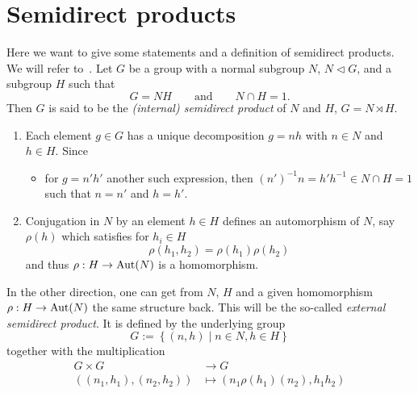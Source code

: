 \chapter{Semidirect products}
\begin{comment}
  see
  \begin{itemize}
    \item \url{http://nlab.mathforge.org/nlab/show/semidirect+product+group}
    \item \url{http://en.wikipedia.org/wiki/Semidirect_product}
    \item \cite{Robinson2003An}
  \end{itemize}
\end{comment}
Here we want to give some statements and a definition of semidirect products.
We will refer to~\cite[75]{Robinson2003An}.
Let $G$ be a group with a normal subgroup $N$, $N\vartriangleleft G$, and a
subgroup $H$ such that
\[
  G=NH\qquad\text{and}\qquad N\cap H=1.
\]
Then $G$ is said to be the \emph{(internal) semidirect product} of $N$ and $H$,
$G=N\rtimes H$.
\begin{rem}
  \begin{enumerate}
    \item Each element $g\in G$ has a unique decomposition $g=nh$ with $n\in N$
      and $h\in H$. Since
      \begin{itemize}
        \item[] for $g=n'h'$ another such expression, then
          $(n')^{-1}n=h'h^{-1}\in N\cap H=1$ such that $n=n'$ and $h=h'$.
      \end{itemize}
    \item Conjugation in $N$ by an element $h\in H$ defines an automorphism of
      $N$, say $\rho(h)$ which satisfies for $h_i\in H$
      \[
        \rho(h_1,h_2)=\rho(h_1)\rho(h_2)
      \]
      and thus $\rho:H\to\operatorname{Aut}(N)$ is a homomorphism.
  \end{enumerate}
\end{rem}
In the other direction, one can get from $N$, $H$ and a given homomorphism
$\rho:H\to\operatorname{Aut}(N)$ the same structure back. This will be the so-called
\emph{external semidirect product}. It is defined by the underlying group
\[
  G:=\left\{(n,h)\mid n\in N,h\in H\right\}
\]
together with the multiplication
\begin{align*}
  G\times G&\to G
\\\left((n_1,h_1),(n_2,h_2)\right)&\mapsto(n_1\rho(h_1)(n_2),h_1h_2)
\end{align*}
